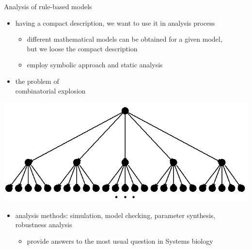 \documentclass[10pt]{beamer}
\begin{document}
\begin{frame}[fragile]{Analysis of rule-based models}

\begin{itemize}
	\item having a compact description, we want to use it in analysis process
	\begin{itemize}
		\item different mathematical models can be obtained for a given model, \\but we loose the compact description
		\item employ symbolic approach and static analysis
	\end{itemize}
\end{itemize}

\begin{minipage}{0.5\textwidth}
\begin{itemize}
	\item the problem of \\combinatorial explosion
\end{itemize}
\end{minipage}
\hfill
\begin{minipage}{0.4\textwidth}
\begin{center}
\includegraphics[scale=0.15]{pics/explosion}
\end{center}
\end{minipage}

\begin{itemize}
	
	\item analysis methods: simulation, model checking, parameter synthesis, robustness analysis

	\begin{itemize}
		\item provide answers to the most usual question in Systems biology
	\end{itemize}
\end{itemize}

\end{frame}
\end{document}
